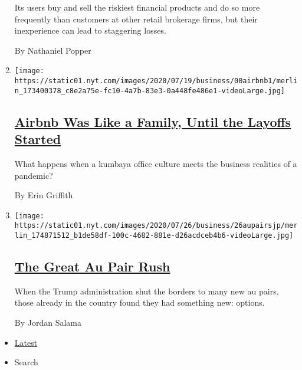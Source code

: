 \begin{enumerate}
  Its users buy and sell the riskiest financial products and do so more
  frequently than customers at other retail brokerage firms, but their
  inexperience can lead to staggering losses.

  By Nathaniel Popper
\item
  \texttt{[image: https://static01.nyt.com/images/2020/07/19/business/00airbnb1/merlin\_173400378\_c8e2a75e-fc10-4a7b-83e3-0a448fe486e1-videoLarge.jpg]}

  \hypertarget{airbnb-was-like-a-family-until-the-layoffs-started}{%
  \subsection{\texorpdfstring{\href{/2020/07/17/technology/airbnb-coronavirus-layoffs-.html}{Airbnb
  Was Like a Family, Until the Layoffs
  Started}}{Airbnb Was Like a Family, Until the Layoffs Started}}\label{airbnb-was-like-a-family-until-the-layoffs-started}}

  What happens when a kumbaya office culture meets the business
  realities of a pandemic?

  By Erin Griffith
\item
  \texttt{[image: https://static01.nyt.com/images/2020/07/26/business/26aupairsjp/merlin\_174871512\_b1de58df-100c-4682-881e-d26acdceb4b6-videoLarge.jpg]}

  \hypertarget{the-great-au-pair-rush}{%
  \subsection{\texorpdfstring{\href{/2020/07/25/business/the-great-au-pair-rush.html}{The
  Great Au Pair
  Rush}}{The Great Au Pair Rush}}\label{the-great-au-pair-rush}}

  When the Trump administration shut the borders to many new au pairs,
  those already in the country found they had something new: options.

  By Jordan Salama
\end{enumerate}

\begin{itemize}
\tightlist
\item
  \protect\hyperlink{stream-panel}{Latest}
\item
  Search
\end{itemize}

